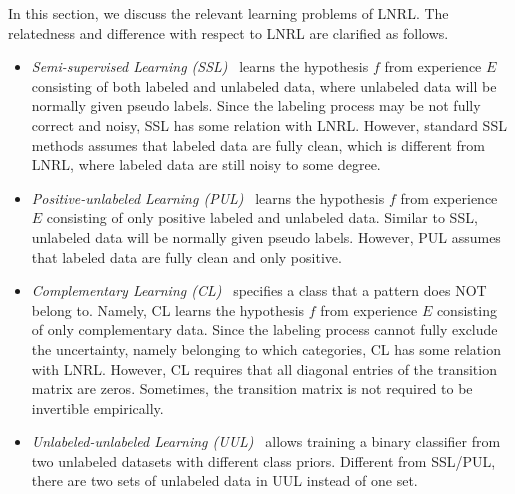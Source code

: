 \label{sec:rl-pro}
In this section, we discuss the relevant learning problems of LNRL. The relatedness and difference with respect to LNRL are clarified as follows.
\begin{itemize}[leftmargin=*]
\item \textit{Semi-supervised Learning (SSL)}~ learns the hypothesis $f$ from experience $E$ consisting of both labeled and unlabeled data, where unlabeled data will be normally given pseudo labels. Since the labeling process may be not fully correct and noisy, SSL has some relation with LNRL. However, standard SSL methods assumes that labeled data are fully clean, which is different from LNRL, where labeled data are still noisy to some degree.
\item \textit{Positive-unlabeled Learning (PUL)}~ learns the hypothesis $f$ from experience $E$ consisting of only positive labeled and unlabeled data. Similar to SSL, unlabeled data will be normally given pseudo labels. However, PUL assumes that labeled data are fully clean and only positive.
\item \textit{Complementary Learning (CL)}~ specifies a class that a pattern does NOT belong to. Namely, CL learns the hypothesis $f$ from experience $E$ consisting of only complementary data. Since the labeling process cannot fully exclude the uncertainty, namely belonging to which categories, CL has some relation with LNRL. However, CL requires that all diagonal entries of the transition matrix are zeros. Sometimes, the transition matrix is not required to be invertible empirically. 
\item \textit{Unlabeled-unlabeled Learning (UUL)}~ 
allows training a binary classifier from two unlabeled datasets with different class priors. 
Different from SSL/PUL, there are two sets of unlabeled data in UUL instead of one set.
\end{itemize}

